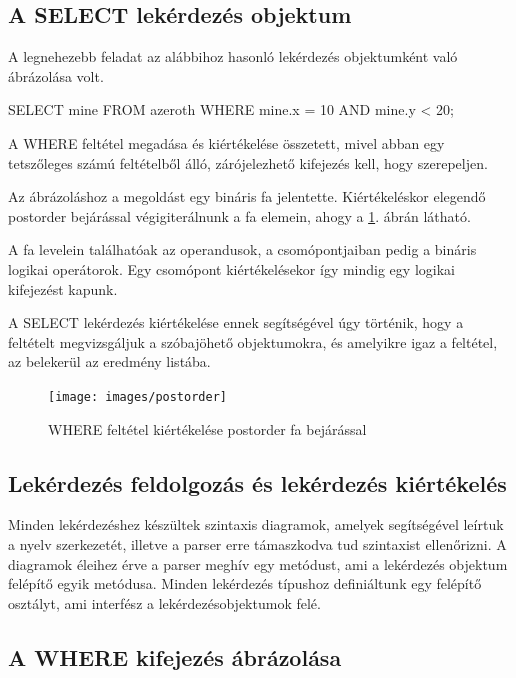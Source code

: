 \subsection{A SELECT lekérdezés objektum}

A legnehezebb feladat az alábbihoz hasonló lekérdezés objektumként való ábrázolása volt.

\begin{sql}
SELECT mine FROM azeroth WHERE mine.x = 10 AND mine.y < 20;
\end{sql}

A WHERE feltétel megadása és kiértékelése összetett, mivel abban egy tetszőleges számú feltételből álló, zárójelezhető kifejezés kell, hogy szerepeljen.

Az ábrázoláshoz a megoldást egy bináris fa jelentette. Kiértékeléskor elegendő postorder bejárással végigiterálnunk a fa elemein, ahogy a \ref{fig:postorder}. ábrán látható.

A fa levelein találhatóak az operandusok, a csomópontjaiban pedig a bináris logikai operátorok. Egy csomópont kiértékelésekor így mindig egy logikai kifejezést kapunk.

A SELECT lekérdezés kiértékelése ennek segítségével úgy történik, hogy a feltételt megvizsgáljuk a szóbajöhető objektumokra, és amelyikre igaz a feltétel, az belekerül az eredmény listába.

\begin{figure}[htb]
	\begin{center}
		\texttt{[image: images/postorder]}
		\caption{WHERE feltétel kiértékelése postorder fa bejárással}
		\label{fig:postorder}
	\end{center}
\end{figure}

\subsection{Lekérdezés feldolgozás és lekérdezés kiértékelés}

Minden lekérdezéshez készültek szintaxis diagramok, amelyek segítségével leírtuk a nyelv szerkezetét, illetve a parser erre támaszkodva tud szintaxist ellenőrizni. A diagramok éleihez érve a parser meghív egy metódust, ami a lekérdezés objektum felépítő egyik metódusa. Minden lekérdezés típushoz definiáltunk egy felépítő osztályt, ami interfész a lekérdezésobjektumok felé.


\subsection{A WHERE kifejezés ábrázolása}

